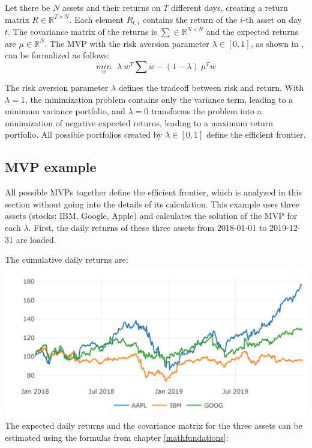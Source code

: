 \documentclass[
  oneside]{book}
\begin{document}
Let there be \(N\) assets and their returns on \(T\) different days, creating a return matrix \(R \in \mathbb{R}^{T \times N}\). Each element \(R_{t,i}\) contains the return of the \(i\)-th asset on day \(t\). The covariance matrix of the returns is \(\textstyle\sum \in \mathbb{R}^{N \times N}\) and the expected returns are \(\mu \in \mathbb{R}^{N}\). The MVP with the risk aversion parameter \(\lambda \in [0,1]\), as shown in \citep{Mari2005}, can be formalized as follows:
\begin{equation} 
\underset{w}{min} \ \ \ \lambda \ w^T \textstyle\sum w - (1-\lambda) \ \mu^T w
\label{eq:MVP}
\end{equation}

The risk aversion parameter \(\lambda\) defines the tradeoff between risk and return. With \(\lambda = 1\), the minimization problem contains only the variance term, leading to a minimum variance portfolio, and \(\lambda = 0\) transforms the problem into a minimization of negative expected returns, leading to a maximum return portfolio. All possible portfolios created by \(\lambda \in [0, 1]\) define the efficient frontier.

\hypertarget{mvp-example}{%
\subsection{MVP example}\label{mvp-example}}

All possible MVPs together define the efficient frontier, which is analyzed in this section without going into the details of its calculation. This example uses three assets (stocks: IBM, Google, Apple) and calculates the solution of the MVP for each \(\lambda\). First, the daily returns of these three assets from 2018-01-01 to 2019-12-31 are loaded.

The cumulative daily returns are:\\
\includegraphics{Master_Thesis_files/figure-latex/MVP_ex2-1.png}
The expected daily returns and the covariance matrix for the three assets can be estimated using the formulas from chapter \ref{mathfundations}:
\end{document}
